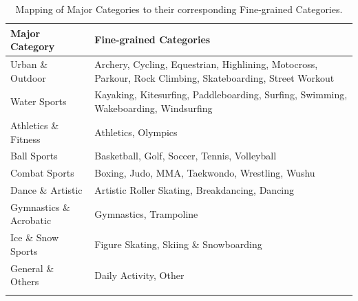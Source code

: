 
\begin{table}[h!]
    \centering
    \caption{Mapping of Major Categories to their corresponding Fine-grained Categories.}
    \label{tab:category_mapping_inline}
    \begin{tabular}{l >{\raggedright\arraybackslash}p{}}
        \toprule
        \textbf{Major Category} & \textbf{Fine-grained Categories} \\
        \midrule
        Urban \& Outdoor & Archery, Cycling, Equestrian, Highlining, Motocross, Parkour, Rock Climbing, Skateboarding, Street Workout \\
        \addlinespace
        
        Water Sports & Kayaking, Kitesurfing, Paddleboarding, Surfing, Swimming, Wakeboarding, Windsurfing \\
        
        Athletics \& Fitness & Athletics, Olympics \\
        \addlinespace %
        
        Ball Sports & Basketball, Golf, Soccer, Tennis, Volleyball \\
        \addlinespace
        
        Combat Sports & Boxing, Judo, MMA, Taekwondo, Wrestling, Wushu \\
        \addlinespace
        
        Dance \& Artistic & Artistic Roller Skating, Breakdancing, Dancing \\
        \addlinespace
        
        Gymnastics \& Acrobatic & Gymnastics, Trampoline \\
        \addlinespace
        
        Ice \& Snow Sports & Figure Skating, Skiing \& Snowboarding \\
        \addlinespace

        General \& Others & Daily Activity, Other \\
        \addlinespace
        \bottomrule
    \end{tabular}
\end{table}
